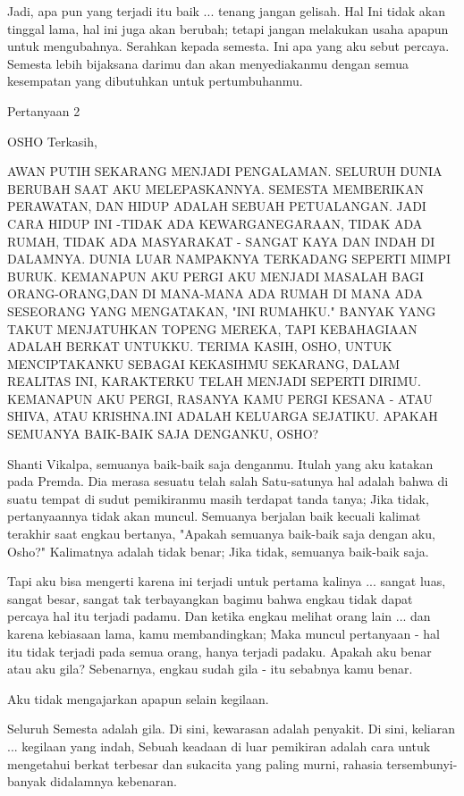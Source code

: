 Jadi, apa pun yang terjadi itu baik ... tenang jangan gelisah. Hal Ini tidak akan tinggal lama, hal ini juga akan berubah; tetapi jangan melakukan usaha apapun untuk mengubahnya. Serahkan kepada semesta. Ini apa yang aku sebut percaya. Semesta lebih bijaksana darimu dan akan menyediakanmu dengan semua kesempatan yang dibutuhkan untuk pertumbuhanmu.

Pertanyaan 2

OSHO Terkasih,

AWAN PUTIH SEKARANG MENJADI PENGALAMAN. SELURUH DUNIA BERUBAH SAAT AKU MELEPASKANNYA. SEMESTA MEMBERIKAN PERAWATAN, DAN HIDUP ADALAH SEBUAH PETUALANGAN. JADI CARA HIDUP INI -TIDAK ADA KEWARGANEGARAAN, TIDAK ADA RUMAH, TIDAK ADA MASYARAKAT - SANGAT KAYA DAN INDAH DI DALAMNYA. DUNIA LUAR NAMPAKNYA TERKADANG SEPERTI MIMPI BURUK. KEMANAPUN AKU PERGI AKU MENJADI MASALAH BAGI ORANG-ORANG,DAN DI MANA-MANA ADA RUMAH DI MANA ADA SESEORANG YANG MENGATAKAN, "INI RUMAHKU." BANYAK YANG TAKUT MENJATUHKAN TOPENG MEREKA, TAPI KEBAHAGIAAN ADALAH BERKAT UNTUKKU. TERIMA KASIH, OSHO, UNTUK MENCIPTAKANKU SEBAGAI KEKASIHMU SEKARANG, DALAM REALITAS INI, KARAKTERKU TELAH MENJADI SEPERTI DIRIMU. KEMANAPUN AKU PERGI, RASANYA KAMU PERGI KESANA - ATAU SHIVA, ATAU KRISHNA.INI ADALAH KELUARGA SEJATIKU. APAKAH SEMUANYA BAIK-BAIK SAJA DENGANKU, OSHO?

Shanti Vikalpa, semuanya baik-baik saja denganmu. Itulah yang aku katakan pada Premda. Dia merasa sesuatu telah salah Satu-satunya hal adalah bahwa di suatu tempat di sudut pemikiranmu masih terdapat tanda tanya; Jika tidak, pertanyaannya tidak akan muncul. Semuanya berjalan baik kecuali kalimat terakhir saat engkau bertanya, "Apakah semuanya baik-baik saja dengan aku, Osho?" Kalimatnya adalah tidak benar; Jika tidak, semuanya baik-baik saja.

Tapi aku bisa mengerti karena ini terjadi untuk pertama kalinya ... sangat luas, sangat besar, sangat tak terbayangkan bagimu bahwa engkau tidak dapat percaya hal itu terjadi padamu. Dan ketika engkau melihat orang lain ... dan karena kebiasaan lama, kamu membandingkan; Maka muncul pertanyaan - hal itu tidak terjadi pada semua orang, hanya terjadi padaku. Apakah aku benar atau aku gila? Sebenarnya, engkau sudah gila - itu sebabnya kamu benar.

Aku tidak mengajarkan apapun selain kegilaan.

Seluruh Semesta adalah gila. Di sini, kewarasan adalah penyakit. Di sini, keliaran ... kegilaan yang indah, Sebuah keadaan di luar pemikiran adalah cara untuk mengetahui berkat terbesar dan sukacita yang paling murni, rahasia tersembunyi-banyak didalamnya kebenaran.

